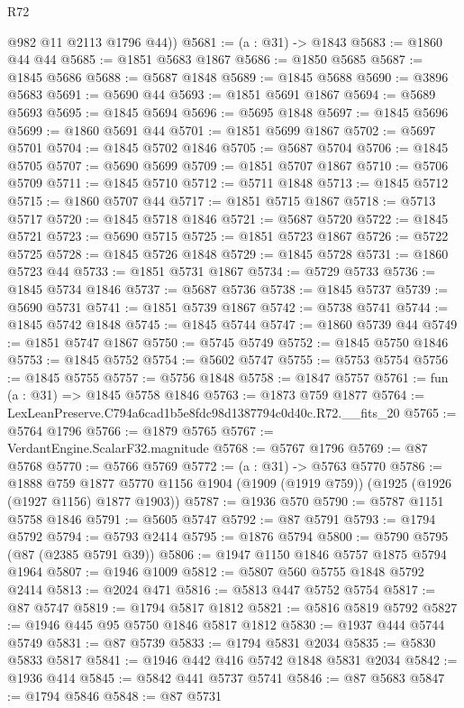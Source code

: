 \begin{lexlean}{R72}
\begin{coremodule}
        @982
        @11
        @2113
        @1796
        @44))
@5681 := (a : @31) -> @1843
@5683 := @1860 @44 @44
@5685 := @1851 @5683 @1867
@5686 := @1850 @5685
@5687 := @1845 @5686
@5688 := @5687 @1848
@5689 := @1845 @5688
@5690 := @3896 @5683
@5691 := @5690 @44
@5693 := @1851 @5691 @1867
@5694 := @5689 @5693
@5695 := @1845 @5694
@5696 := @5695 @1848
@5697 := @1845 @5696
@5699 := @1860 @5691 @44
@5701 := @1851 @5699 @1867
@5702 := @5697 @5701
@5704 := @1845 @5702 @1846
@5705 := @5687 @5704
@5706 := @1845 @5705
@5707 := @5690 @5699
@5709 := @1851 @5707 @1867
@5710 := @5706 @5709
@5711 := @1845 @5710
@5712 := @5711 @1848
@5713 := @1845 @5712
@5715 := @1860 @5707 @44
@5717 := @1851 @5715 @1867
@5718 := @5713 @5717
@5720 := @1845 @5718 @1846
@5721 := @5687 @5720
@5722 := @1845 @5721
@5723 := @5690 @5715
@5725 := @1851 @5723 @1867
@5726 := @5722 @5725
@5728 := @1845 @5726 @1848
@5729 := @1845 @5728
@5731 := @1860 @5723 @44
@5733 := @1851 @5731 @1867
@5734 := @5729 @5733
@5736 := @1845 @5734 @1846
@5737 := @5687 @5736
@5738 := @1845 @5737
@5739 := @5690 @5731
@5741 := @1851 @5739 @1867
@5742 := @5738 @5741
@5744 := @1845 @5742 @1848
@5745 := @1845 @5744
@5747 := @1860 @5739 @44
@5749 := @1851 @5747 @1867
@5750 := @5745 @5749
@5752 := @1845 @5750 @1846
@5753 := @1845 @5752
@5754 := @5602 @5747
@5755 := @5753 @5754
@5756 := @1845 @5755
@5757 := @5756 @1848
@5758 := @1847 @5757
@5761 := fun (a : @31) => @1845 @5758 @1846
@5763 := @1873 @759 @1877
@5764 := LexLeanPreserve.C794a6cad1b5e8fdc98d1387794c0d40c.R72.__fits_20
@5765 := @5764 @1796
@5766 := @1879 @5765
@5767 := VerdantEngine.ScalarF32.magnitude
@5768 := @5767 @1796
@5769 := @87 @5768
@5770 := @5766 @5769
@5772 := (a : @31) -> @5763 @5770
@5786 := @1888
    @759
    @1877
    @5770
    @1156
    @1904
    (@1909 (@1919 @759))
    (@1925 (@1926 (@1927 @1156) @1877 @1903))
@5787 := @1936 @570
@5790 := @5787 @1151 @5758 @1846
@5791 := @5605 @5747
@5792 := @87 @5791
@5793 := @1794 @5792
@5794 := @5793 @2414
@5795 := @1876 @5794
@5800 := @5790 @5795 (@87 (@2385 @5791 @39))
@5806 := @1947 @1150 @1846 @5757 @1875 @5794 @1964
@5807 := @1946 @1009
@5812 := @5807 @560 @5755 @1848 @5792 @2414
@5813 := @2024 @471
@5816 := @5813 @447 @5752 @5754
@5817 := @87 @5747
@5819 := @1794 @5817 @1812
@5821 := @5816 @5819 @5792
@5827 := @1946 @445 @95 @5750 @1846 @5817 @1812
@5830 := @1937 @444 @5744 @5749
@5831 := @87 @5739
@5833 := @1794 @5831 @2034
@5835 := @5830 @5833 @5817
@5841 := @1946 @442 @416 @5742 @1848 @5831 @2034
@5842 := @1936 @414
@5845 := @5842 @441 @5737 @5741
@5846 := @87 @5683
@5847 := @1794 @5846
@5848 := @87 @5731

\end{coremodule}
\end{lexlean}
